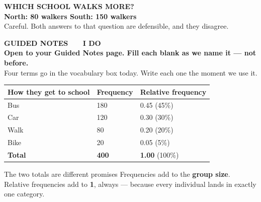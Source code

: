 \documentclass[aspectratio=169, 11pt]{beamer}
\begin{document}
{
\begin{frame}[plain]
  \vspace{1.3cm}
  \begin{center}
    {\color{skymid}\bfseries\small WHICH SCHOOL WALKS MORE?}\\[0.8cm]
    {\color{white}\bfseries\Large North: 80 walkers \qquad South: 150 walkers}\\[0.9cm]
    {\color{goldacc}\small Careful. Both answers to that question are defensible,
    and they disagree.}
  \end{center}
\end{frame}
}

{
\begin{frame}[plain]
  \vspace{1.8cm}\hspace{0.8cm}%
  \begin{minipage}{0.86\textwidth}
    {\color{goldacc}\bfseries\small GUIDED NOTES \ \textbullet\ \ I DO}\\[0.7cm]
    {\color{white}\bfseries\Large Open to your Guided Notes page. Fill each blank as we
    name it --- not before.}\\[0.9cm]
    {\color{skymid}\small Four terms go in the vocabulary box today. Write each one the
    moment we use it.}
  \end{minipage}
\end{frame}
}

\begin{frame}[t, plain]
  \vspace{2pt}
  \renewcommand{\arraystretch}{1.3}
  \begin{tabularx}{\textwidth}{@{} l Y Y @{}}
    \textbf{How they get to school} & \textbf{Frequency} & \textbf{Relative frequency} \\
    \hline
    Bus  & 180 & 0.45 \quad (45\%) \\
    Car  & 120 & 0.30 \quad (30\%) \\
    Walk &  80 & 0.20 \quad (20\%) \\
    Bike &  20 & 0.05 \quad (5\%)  \\
    \hline
    \textbf{Total} & \textbf{400} & \textbf{1.00} \quad (100\%) \\
  \end{tabularx}
  \vspace{10pt}
  \begin{block}{The two totals are different promises}
    Frequencies add to the \textbf{group size}. Relative frequencies add to \textbf{1},
    always --- because every individual lands in exactly one category.
  \end{block}
\end{frame}
\end{document}
